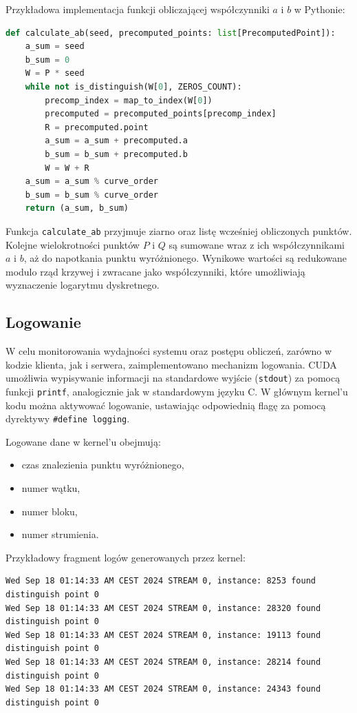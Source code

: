 Przykładowa implementacja funkcji obliczającej współczynniki $a$ i $b$ w Pythonie:

\begin{lstlisting}[language=Python, caption=Obliczanie współczynników $a$ i $b$]
def calculate_ab(seed, precomputed_points: list[PrecomputedPoint]):
    a_sum = seed
    b_sum = 0
    W = P * seed
    while not is_distinguish(W[0], ZEROS_COUNT):
        precomp_index = map_to_index(W[0])
        precomputed = precomputed_points[precomp_index]
        R = precomputed.point
        a_sum = a_sum + precomputed.a
        b_sum = b_sum + precomputed.b
        W = W + R
    a_sum = a_sum % curve_order
    b_sum = b_sum % curve_order
    return (a_sum, b_sum)
\end{lstlisting}

Funkcja \texttt{calculate\_ab} przyjmuje ziarno oraz listę wcześniej
obliczonych punktów. Kolejne wielokrotności punktów $P$ i $Q$ są sumowane wraz
z ich współczynnikami $a$ i $b$, aż do napotkania punktu wyróżnionego. Wynikowe
wartości są redukowane modulo rząd krzywej i zwracane jako współczynniki, które
umożliwiają wyznaczenie logarytmu dyskretnego.

\subsection{Logowanie}

W celu monitorowania wydajności systemu oraz postępu obliczeń, zarówno w kodzie
klienta, jak i serwera, zaimplementowano mechanizm logowania. CUDA umożliwia
wypisywanie informacji na standardowe wyjście (\texttt{stdout}) za pomocą funkcji
\texttt{printf}, analogicznie jak w standardowym języku C. W głównym kernel'u kodu
można aktywować logowanie, ustawiając odpowiednią flagę za pomocą dyrektywy
\texttt{\#define logging}.

Logowane dane w kernel'u obejmują:
\begin{itemize}
    \item czas znalezienia punktu wyróżnionego,
    \item numer wątku,
    \item numer bloku,
    \item numer strumienia.
\end{itemize}

Przykładowy fragment logów generowanych przez kernel:
\begin{verbatim}
Wed Sep 18 01:14:33 AM CEST 2024 STREAM 0, instance: 8253 found distinguish point 0
Wed Sep 18 01:14:33 AM CEST 2024 STREAM 0, instance: 28320 found distinguish point 0
Wed Sep 18 01:14:33 AM CEST 2024 STREAM 0, instance: 19113 found distinguish point 0
Wed Sep 18 01:14:33 AM CEST 2024 STREAM 0, instance: 28214 found distinguish point 0
Wed Sep 18 01:14:33 AM CEST 2024 STREAM 0, instance: 24343 found distinguish point 0
\end{verbatim}


